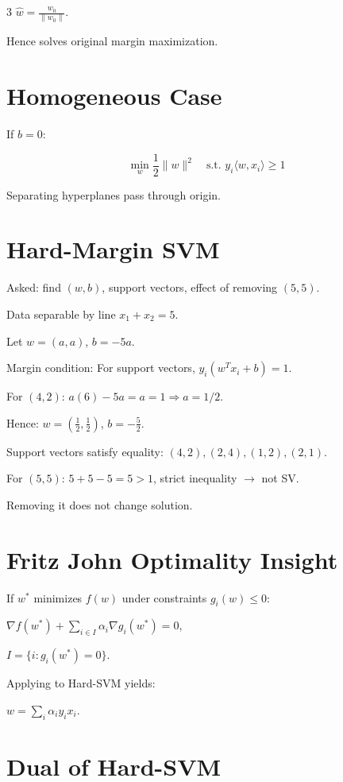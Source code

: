 \documentclass[8pt,fleqn]{extarticle}
\begin{document}
\begin{multicols}{3}
$\hat w=\frac{w_0}{\|w_0\|}$.

Hence solves original margin maximization.

\section*{Homogeneous Case}

If $b=0$:

\[
\min_w \frac12\|w\|^2
\quad \text{s.t. } y_i\langle w,x_i\rangle\ge1
\]

Separating hyperplanes pass through origin.

\section*{Hard-Margin SVM}

Asked: find $(w,b)$, support vectors, effect of removing $(5,5)$.

Data separable by line $x_1+x_2=5$.

Let $w=(a,a)$, $b=-5a$.

Margin condition:
For support vectors,
$y_i(w^Tx_i+b)=1$.

For $(4,2)$:
$a(6)-5a=a=1 \Rightarrow a=1/2$.

Hence:
$w=(\tfrac12,\tfrac12)$,
$b=-\tfrac52$.

Support vectors satisfy equality:
$(4,2),(2,4),(1,2),(2,1)$.

For $(5,5)$:
$5+5-5=5>1$,
strict inequality $\to$ not SV.

Removing it does not change solution.


\section*{Fritz John Optimality Insight}

If $w^*$ minimizes $f(w)$ under constraints $g_i(w)\le0$:

$\nabla f(w^*) + \sum_{i\in I}\alpha_i\nabla g_i(w^*)=0$,

$I=\{i: g_i(w^*)=0\}$.

Applying to Hard-SVM yields:

$w=\sum_i \alpha_i y_i x_i$.

\section*{Dual of Hard-SVM}


\end{multicols}
\end{document}
